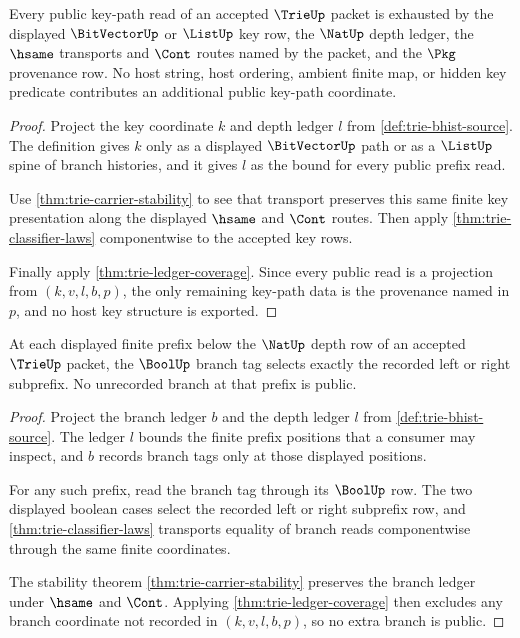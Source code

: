 \begin{theorem}\label{thm:trie-key-path-exhaustion}
Every public key-path read of an accepted $\TrieUp$ packet is exhausted by
the displayed $\BitVectorUp$ or $\ListUp$ key row, the $\NatUp$ depth ledger,
the $\hsame$ transports and $\Cont$ routes named by the packet, and the
$\Pkg$ provenance row. No host string, host ordering, ambient finite map, or
hidden key predicate contributes an additional public key-path coordinate.
\end{theorem}
\begin{proof}
Project the key coordinate $k$ and depth ledger $l$ from
\autoref{def:trie-bhist-source}. The definition gives $k$ only as a displayed
$\BitVectorUp$ path or as a $\ListUp$ spine of branch histories, and it gives
$l$ as the bound for every public prefix read.

Use \autoref{thm:trie-carrier-stability} to see that transport preserves this
same finite key presentation along the displayed $\hsame$ and $\Cont$ routes.
Then apply \autoref{thm:trie-classifier-laws} componentwise to the accepted
key rows.

Finally apply \autoref{thm:trie-ledger-coverage}. Since every public read is
a projection from $(k,v,l,b,p)$, the only remaining key-path data is the
provenance named in $p$, and no host key structure is exported.
\end{proof}

\begin{theorem}\label{thm:trie-prefix-branch-determinacy}
At each displayed finite prefix below the $\NatUp$ depth row of an accepted
$\TrieUp$ packet, the $\BoolUp$ branch tag selects exactly the recorded left
or right subprefix. No unrecorded branch at that prefix is public.
\end{theorem}
\begin{proof}
Project the branch ledger $b$ and the depth ledger $l$ from
\autoref{def:trie-bhist-source}. The ledger $l$ bounds the finite prefix
positions that a consumer may inspect, and $b$ records branch tags only at
those displayed positions.

For any such prefix, read the branch tag through its $\BoolUp$ row. The two
displayed boolean cases select the recorded left or right subprefix row, and
\autoref{thm:trie-classifier-laws} transports equality of branch reads
componentwise through the same finite coordinates.

The stability theorem \autoref{thm:trie-carrier-stability} preserves the
branch ledger under $\hsame$ and $\Cont$. Applying
\autoref{thm:trie-ledger-coverage} then excludes any branch coordinate not
recorded in $(k,v,l,b,p)$, so no extra branch is public.
\end{proof}

